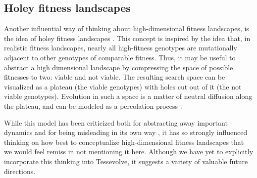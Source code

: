 \subsection{Holey fitness landscapes}

Another influential way of thinking about high-dimensional fitness landscapes, is the idea of holey fitness landscapes \citep{gavrilets_evolution_1997}. This concept is inspired by the idea that, in realistic fitness landscapes, nearly all high-fitness genotypes are mutationally adjacent to other genotypes of comparable fitness. Thus, it may be useful to abstract a high dimensional landscape by compressing the space of possible fitnesses to two: viable and not viable. The resulting search space can be visualized as a plateau (the viable genotypes) with holes cut out of it (the not viable genotypes). Evolution in such a space is a matter of neutral diffusion along the plateau, and can be modeled as a percolation process \citep{gavrilets_high-dimensional_2010}.

While this model has been criticized both for abstracting away important dynamics and for being misleading in its own way \citep{kaplan_end_2008}, it has so strongly influenced thinking on how best to conceptualize high-dimensional fitness landscapes that we would feel remiss in not mentioning it here. Although we have yet to explicitly incorporate this thinking into Tessevolve, it suggests a variety of valuable future directions.